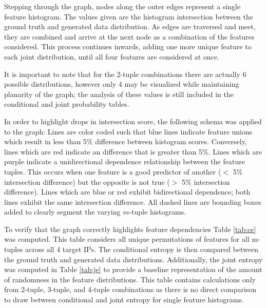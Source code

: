 Stepping through the graph, nodes along the outer edges represent a single feature histogram. The values given are the histogram intersection between the ground truth and generated data distribution. As edges are traversed and meet, they are combined and arrive at the next node as a combination of the features considered. This process continues inwards, adding one more unique feature to each joint distribution, until all four features are considered at once.

It is important to note that for the 2-tuple combinations there are actually 6 possible distributions, however only 4 may be visualized while maintaining planarity of the graph; the analysis of these values is still included in the conditional and joint probability tables.

In order to highlight drops in intersection score, the following schema was applied to the graph: Lines are color coded such that blue lines indicate feature unions which result in less than 5\% difference between histogram scores. Conversely, lines which are red indicate an difference that is greater than 5\%. Lines which are purple indicate a unidirectional dependence relationship between the feature tuples. This occurs when one feature is a good predictor of another ($<$ 5\% intersection difference) but the opposite is not true ($>$ 5\% intersection difference). Lines which are blue or red exhibit bidirectional dependence; both lines exhibit the same intersection difference. All dashed lines are bounding boxes added to clearly segment the varying $m$-tuple histograms.

To verify that the graph correctly highlights feature dependencies Table \ref{tab:ce} was computed. This table considers all unique permutations of features for all m-tuples across all 4 target IPs. The conditional entropy is then compared between the ground truth and generated data distributions. Additionally, the joint entropy was computed in Table \ref{tab:je} to provide a baseline representation of the amount of randomness in the feature distributions. This table contains calculations only from 2-tuple, 3-tuple, and 4-tuple combinations as there is no direct comparison to draw between conditional and joint entropy for single feature histograms.


